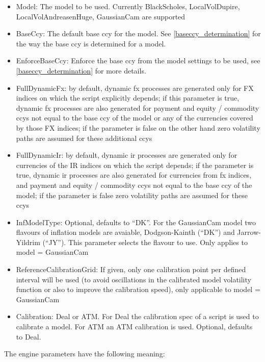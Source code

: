 \begin{itemize}
\item Model: The model to be used. Currently BlackScholes, LocalVolDupire, LocalVolAndreasenHuge, GaussianCam are
  supported
\item BaseCcy: The default base ccy for the model. See \ref{baseccy_determination} for the way the base ccy is
  determined for a model.
\item EnforceBaseCcy: Enforce the base ccy from the model settings to be used, see \ref{baseccy_determination} for more
  details.
\item FullDynamicFx: by default, dynamic fx processes are generated only for FX indices on which the script explicitly
  depends; if this parameter is true, dynamic fx processes are also generated for payment and equity / commodity ccys
  not equal to the base ccy of the model or any of the currencies covered by those FX indices; if the parameter is false
  on the other hand zero volatility paths are assumed for these additional ccys
\item FullDynamicIr: by default, dynamic ir processes are generated only for currencies of the IR indices on which the
  script depends; if the parameter is true, dynamic ir processes are also generated for currencies from fx indices, and
  payment and equity / commodity ccys not equal to the base ccy of the model; if the parameter is false zero volatility
  paths are assumed for these ccys
\item InfModelType: Optional, defaults to ``DK''. For the GaussianCam model two flavours of inflation models are
  avaiable, Dodgson-Kainth (``DK'') and Jarrow-Yildrim (``JY''). This parameter selects the flavour to use. Only applies
  to model = GaussianCam
\item ReferenceCalibrationGrid: If given, only one calibration point per defined interval will be used (to avoid
  oscillations in the calibrated model volatility function or also to improve the calibration speed), only applicable to
  model = GaussianCam
\item Calibration: Deal or ATM. For Deal the calibration spec of a script is used to calibrate a model. For ATM an ATM
  calibration is used. Optional, defaults to Deal.
\end{itemize}

The engine parameters have the following meaning:


